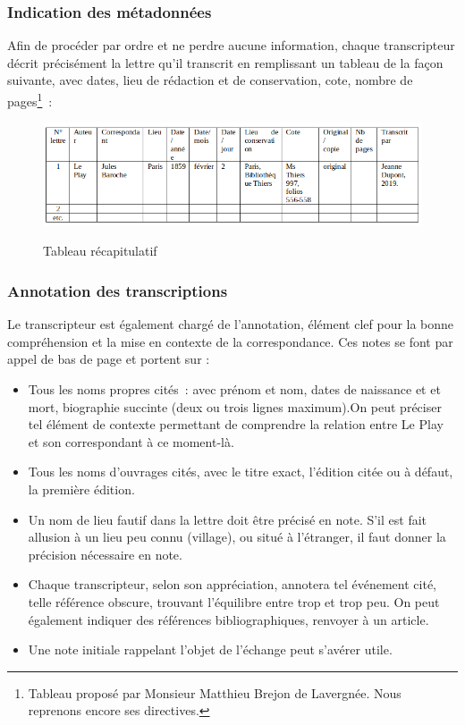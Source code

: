  \subsubsection{Indication des métadonnées}
 
 Afin de procéder par ordre et ne perdre aucune information, chaque transcripteur décrit précisément la lettre qu'il transcrit en remplissant un tableau de la façon suivante, avec dates, lieu de rédaction et de conservation, cote, nombre de pages\footnote{Tableau proposé par Monsieur Matthieu Brejon de Lavergnée. Nous reprenons encore ses directives.}~:
 
\begin{figure}[ht]
    \centering
    \caption{Tableau récapitulatif}
    \includegraphics[width=16cm]{images/metadonnees.png}
    \label{metadonnees}
\end{figure}
 
 \subsubsection{Annotation des transcriptions}
 
 Le transcripteur est également chargé de l'annotation, élément clef pour la bonne compréhension et la mise en contexte de la correspondance. Ces notes se font par appel de bas de page et portent sur :
\begin{itemize}
    \item Tous les noms propres cités : avec prénom et nom, dates de naissance et et mort, biographie succinte (deux ou trois lignes maximum).On peut préciser tel élément de contexte permettant de comprendre la relation entre Le Play et son correspondant à ce moment-là.
    \item Tous les noms d'ouvrages cités, avec le titre exact, l'édition citée ou à défaut, la première édition.
    \item Un nom de lieu fautif dans la lettre doit être précisé en note. S’il est fait allusion à un lieu peu connu (village), ou situé à l’étranger, il faut donner la précision nécessaire en note.
    \item Chaque transcripteur, selon son appréciation, annotera tel événement cité, telle référence obscure, trouvant l'équilibre entre trop et trop peu. On peut également indiquer des références bibliographiques, renvoyer à un article.
    \item Une note initiale rappelant l'objet de l'échange peut s'avérer utile.
\end{itemize}
 
